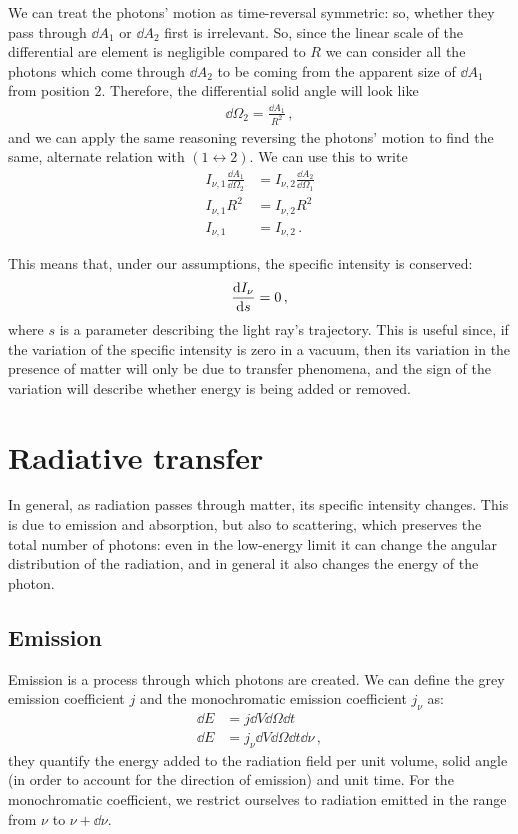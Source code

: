 \documentclass[main.tex]{subfiles}
\begin{document}
We can treat the photons' motion as time-reversal symmetric: so, whether they pass through \(\dd{A_1 }\) or \(\dd{A_2 }\) first is irrelevant. 
So, since the linear scale of the differential are element is negligible compared to \(R\) we can consider all the photons which come through \(\dd{A_2 }\) to be coming from the apparent size of \(\dd{A_1 }\) from position \(2\). 
Therefore, the differential solid angle will look like 
%
\begin{align}
\dd{\Omega_2 } = \frac{ \dd{A_1 } }{R^2}
\,,
\end{align}
%
and we can apply the same reasoning reversing the photons' motion to find the same, alternate relation with \((1 \leftrightarrow 2)\). 
We can use this to write 
%
\begin{align}
I_{\nu , 1} \frac{ \dd{A_1 }}{ \dd{\Omega_2 }} &= 
I_{\nu , 2} \frac{ \dd{A_2 }}{ \dd{\Omega_1 }}  \\
I_{\nu ,1 } R^2 &= I_{\nu , 2} R^2  \\
I_{\nu , 1} &= I_{\nu , 2}
\,.
\end{align}

This means that, under our assumptions, the specific intensity is conserved: 
%
\begin{align}
\dv{I_{\nu }}{s} = 0
\,,
\end{align}
%
where \(s\) is a parameter describing the light ray's trajectory.
This is useful since, if the variation of the specific intensity is zero in a vacuum, then its variation in the presence of matter will only be due to transfer phenomena, and the sign of the variation will describe whether energy is being added or removed. 

\section{Radiative transfer}

In general, as radiation passes through matter, its specific intensity changes.
This is due to emission and absorption, but also to scattering, which preserves the total number of photons: even in the low-energy limit it can change the angular distribution of the radiation, and in general it also changes the energy of the photon.

\subsection{Emission}

Emission is a process through which photons are created. 
We can define the grey emission coefficient \(j\) and the monochromatic emission coefficient \(j_{\nu }\) as: 
%
\begin{align}
\dd{E} &= j \dd{V} \dd{\Omega } \dd{t}  \\
\dd{E} &= j_{\nu } \dd{V} \dd{\Omega } \dd{t} \dd{\nu }
\,,
\end{align}
%
they quantify the energy added to the radiation field per unit volume, solid angle (in order to account for the direction of emission) and unit time. For the monochromatic coefficient, we restrict ourselves to radiation emitted in the range from \(\nu \) to \(\nu + \dd{\nu }\).
\end{document}
